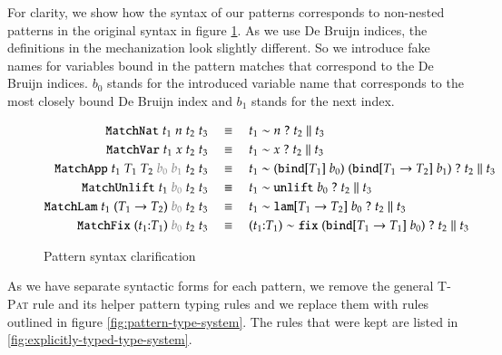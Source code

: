 \documentclass[runningheads]{article}
\newcommand{\tpd}[2]{{#1}{:}{#2}}
\newcommand{\patnat}[1]{#1}
\newcommand{\patapp}[2]{#1\;#2}
\newcommand{\patref}[1]{#1}
\newcommand{\patunlift}[1]{\texttt{unlift}\;#1}
\newcommand{\patbind}[2]{\texttt{bind}[#2]\;#1}
\newcommand{\patlam}[2]{\texttt{lam}[#2]\;#1}
\newcommand{\patfix}[1]{\texttt{fix}\;#1}
\newcommand{\patmat}[4]{\patmatSP{#1}{#2}\patmatThen{#3}#4}
\newcommand{\patmatSP}[2]{#1 \sim #2\;?}
\newcommand{\patmatThen}[1]{\;#1\; \| \;}
\begin{document}
For clarity, we show how the syntax of our patterns corresponds to non-nested patterns in the original syntax in figure \ref{fig:pattern-syntax}. As we use De Bruijn indices, the definitions in the mechanization look slightly different. So we introduce fake names for variables bound in the pattern matches that correspond to the De Bruijn indices. $b_0$ stands for the introduced variable name that corresponds to the most closely bound De Bruijn index and $b_1$ stands for the next index.

\newcommand{\syntaxeq}[2]{ #1 \quad &\equiv \quad #2 \\ }

\begin{figure}[h]
  \centering
  \begin{framed}
    \begin{align}
     \syntaxeq
     { \texttt{MatchNat} \; t_1 \; n \; t_2 \; t_3 }
     { \patmat{t_1}{\patnat{n}}{t_2}{t_3} }     
    \syntaxeq
     { \texttt{MatchVar} \; t_1 \; x \; t_2 \; t_3 }
     { \patmat{t_1}{\patref{x}}{t_2}{t_3} }
         \syntaxeq
     { \texttt{MatchApp} \; t_1 \; T_1 \; T_2 \; {\color{gray}b_0} \; {\color{gray}b_1} \; t_2 \; t_3 }
     { \patmat{t_1}{\patapp{(\patbind{b_0}{T_1})}{(\patbind{b_1}{T_1 \to T_2})}}{t_2}{t_3} }     
         \syntaxeq
     { \texttt{MatchUnlift} \; t_1 \; {\color{gray}b_0} \; t_2 \; t_3 }
     { \patmat{t_1}{\patunlift{b_0}}{t_2}{t_3} }  
         \syntaxeq
     { \texttt{MatchLam} \; t_1 \; (T_1 \to T_2) \; {\color{gray}b_0} \; t_2 \; t_3 }
     { \patmat{t_1}{\patlam{b_0}{T_1 \to T_2}}{t_2}{t_3} }
     \syntaxeq
     { \texttt{MatchFix} \; (\tpd{t_1}{T_1}) \; {\color{gray}b_0} \; t_2 \; t_3 }
     { \patmat{(\tpd{t_1}{T_1})}{\patfix{(\patbind{b_0}{T_1 \to T_1})}}{t_2}{t_3} }
     \end{align}
  \end{framed}
  \caption{Pattern syntax clarification}
  \label{fig:pattern-syntax}
\end{figure}

As we have separate syntactic forms for each pattern, we remove the general \textsc{T-Pat} rule and its helper pattern typing rules and we replace them with rules outlined in figure \ref{fig:pattern-type-system}. The rules that were kept are listed in \ref{fig:explicitly-typed-type-system}.
\end{document}
